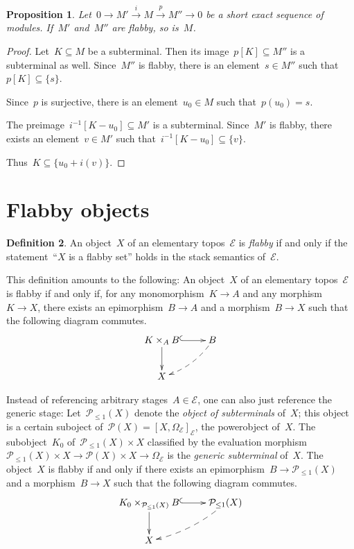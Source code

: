 \documentclass[oneside]{amsart}
\theoremstyle{definition}
\newtheorem{defn}{Definition}[section]
\theoremstyle{plain}
\newtheorem{prop}[defn]{Proposition}
\theoremstyle{remark}
\newcommand{\xra}[1]{\xrightarrow{#1}}
\newcommand{\E}{\mathcal{E}}
\renewcommand{\P}{\mathcal{P}}
\renewcommand{\_}{\mathpunct{.}\,}
\begin{document}
\begin{prop}Let~$0 \to M' \xra{i} M \xra{p} M'' \to 0$ be a short exact
sequence of modules. If~$M'$ and~$M''$ are flabby, so is~$M$.
\end{prop}

\begin{proof}Let~$K \subseteq M$ be a subterminal. Then its image~$p[K] \subseteq M''$
is a subterminal as well. Since~$M''$ is flabby, there is an element~$s \in
M''$ such that~$p[K] \subseteq \{ s \}$.

Since~$p$ is surjective, there is an element~$u_0 \in M$ such that~$p(u_0) =
s$.

The preimage~$i^{-1}[K - u_0] \subseteq M'$ is a subterminal. Since~$M'$ is
flabby, there exists an element~$v \in M'$ such that~$i^{-1}[K - u_0] \subseteq
\{v\}$.

Thus~$K \subseteq \{ u_0 + i(v) \}$.
\end{proof}


\section{Flabby objects}

\begin{defn}An object~$X$ of an elementary topos~$\E$ is \emph{flabby} if and
only if the statement~``$X$ is a flabby set'' holds in the stack semantics
of~$\E$.\end{defn}

This definition amounts to the following: An object~$X$ of an elementary
topos~$\E$ is flabby if and only if, for any monomorphism~$K \to A$ and any
morphism~$K \to X$, there exists an epimorphism~$B \to A$ and a morphism~$B
\to X$ such that the following diagram commutes.
\[ \xymatrix{
  K \times_A B \ar@{^{(}->}[r]\ar[d] & B \ar@{-->}@/^/[ld] \\
  X
} \]

Instead of referencing arbitrary stages~$A \in \E$, one can also just reference
the generic stage: Let~$\P_{\leq1}(X)$ denote the \emph{object of subterminals}
of~$X$; this object is a certain suboject of~$\P(X) = [X,\Omega_\E]_\E$, the
powerobject of~$X$. The subobject~$K_0$ of~$\P_{\leq1}(X) \times X$ classified by the
evaluation morphism~$\P_{\leq1}(X) \times X \to \P(X) \times X \to \Omega_\E$
is the \emph{generic subterminal} of~$X$. The object~$X$ is flabby if and only
if there exists an epimorphism~$B \to \P_{\leq1}(X)$ and a morphism~$B \to X$
such that the following diagram commutes.
\[ \xymatrix{
  K_0 \times_{\P_{\leq1}(X)} B \ar@{^{(}->}[r]\ar[d] & \P_{\leq1}(X) \ar@{-->}@/^/[ld] \\
  X
} \]
\end{document}
